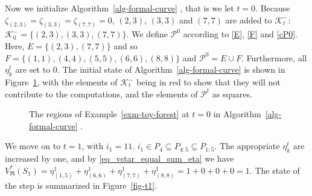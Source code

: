 \documentclass[
  11pt,
  a4paper,
]{article}
\theoremstyle{plain}
\theoremstyle{definition}
\theoremstyle{plain}
\theoremstyle{definition}
\theoremstyle{plain}
\theoremstyle{remark}
\begin{document}
Now we initialize  Algorithm~\ref{alg-formal-curve} , that is we let
\(t=0\). Because \(\zeta_{(2, 3)}=\zeta_{(3, 3)}=\zeta_{(7,7)}=0\),
\((2,3)\), \((3,3)\) and \((7, 7)\) are added to \(\mathcal{K}^-_t\):
\(\mathcal{K}^-_0=\{(2, 3), (3, 3), (7, 7)\}\). We define
\(\mathcal{P}^0\) according to \eqref{E}, \eqref{F} and \eqref{cP0}.
Here, \(E=\{(2,3), (7,7)\}\) and so
\(F=\{(1,1), (4,4), (5,5), (6,6), (8,8)\}\) and
\(\mathcal{P}^0=E\cup F\). Furthermore, all \(\eta_k^t\) are set to 0.
The initial state of  Algorithm~\ref{alg-formal-curve}  is shown in
Figure~\ref{fig-t0}, with the elements of \(\mathcal{K}^-_t\) being in
red to show that they will not contribute to the computations, and the
elements of \(\mathcal{P}^t\) as squares.

\begin{figure}


\caption{\label{fig-t0}The regions of Example~\ref{exm-toy-forest} at
\(t=0\) in  Algorithm~\ref{alg-formal-curve} .}

\end{figure}%

We move on to \(t=1\), with \(i_1=11\).
\(i_1\in P_4\subseteq P_{4:5}\subseteq P_{1:5}\). The appropriate
\(\eta_k^t\) are increased by one, and by \eqref{eq_vstar_equal_sum_eta}
we have
\(V^*_{\mathfrak{R}}(S_1)=\eta_{(1, 5)}^1+\eta_{(6, 6)}^1+\eta_{(7, 7)}^1+\eta_{(8, 8)}^1=1+0+0+0=1\).
The state of the step is summarized in Figure~\ref{fig-t1}.
\end{document}
